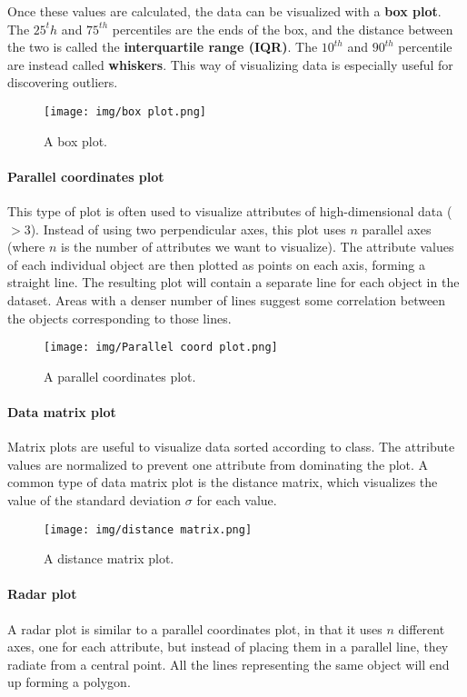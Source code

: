 Once these values are calculated, the data can be visualized with a \textbf{box plot}. The $25^th$ and $75^{th}$ percentiles are the ends of the box, and the distance between the two is called the \textbf{interquartile range (IQR)}. The $10^{th}$ and $90^{th}$ percentile are instead called \textbf{whiskers}. This way of visualizing data is especially useful for discovering outliers.

\begin{figure}[h]
    \centering
    \texttt{[image: img/box plot.png]}
    \caption{A box plot.}
\end{figure}

\paragraph{Parallel coordinates plot}
This type of plot is often used to visualize attributes of high-dimensional data ($> 3$). Instead of using two perpendicular axes, this plot uses $n$ parallel axes (where $n$ is the number of attributes we want to visualize). The attribute values of each individual object are then plotted as points on each axis, forming a straight line. The resulting plot will contain a separate line for each object in the dataset. Areas with a denser number of lines suggest some correlation between the objects corresponding to those lines.

\begin{figure}[h]
    \centering
    \texttt{[image: img/Parallel coord plot.png]}  
    \caption{A parallel coordinates plot.}
\end{figure}

\paragraph{Data matrix plot}
Matrix plots are useful to visualize data sorted according to class. The attribute values are normalized to prevent one attribute from dominating the plot. A common type of data matrix plot is the distance matrix, which visualizes the value of the standard deviation $\sigma$ for each value.

\begin{figure}[h]
    \centering
    \texttt{[image: img/distance matrix.png]}
    \caption{A distance matrix plot.}
\end{figure}

\paragraph{Radar plot}
A radar plot is similar to a parallel coordinates plot, in that it uses $n$ different axes, one for each attribute, but instead of placing them in a parallel line, they radiate from a central point. All the lines representing the same object will end up forming a polygon.

